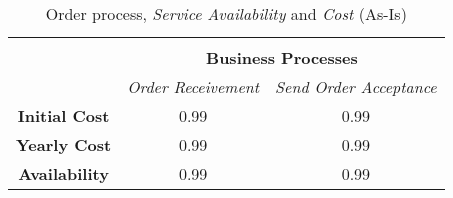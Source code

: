\begin{table}[H]
\begin{tabular}{|c|c|p{2cm}|p{2.5cm}|p{2.5cm}|p{2.5cm}|}
		\multicolumn{6}{c}{} \\ \cline{3-6}
		\multicolumn{2}{c}{} & \multicolumn{4}{|c|}{\textbf{Business Processes}} \\ \cline{3-6}
		\multicolumn{2}{c|}{} & \multicolumn{2}{c|}{\textsl{Order Receivement}} & \multicolumn{2}{c|}{\textsl{Send Order Acceptance}} \\
		\hline
		\multicolumn{2}{|c|}{\textbf{Initial Cost}} & \multicolumn{2}{c|}{0.99} & \multicolumn{2}{c|}{0.99} \\ \hline
		\multicolumn{2}{|c|}{\textbf{Yearly Cost}}  & \multicolumn{2}{c|}{0.99} & \multicolumn{2}{c|}{0.99} \\ \hline
		\multicolumn{2}{|c|}{\textbf{Availability}}  & \multicolumn{2}{c|}{0.99} & \multicolumn{2}{c|}{0.99} \\ \hline
	\end{tabular}
\caption{Order process, \textsl{Service Availability} and \textsl{Cost} (As-Is)} 
\label{tab:order_as_is}
\end{table}